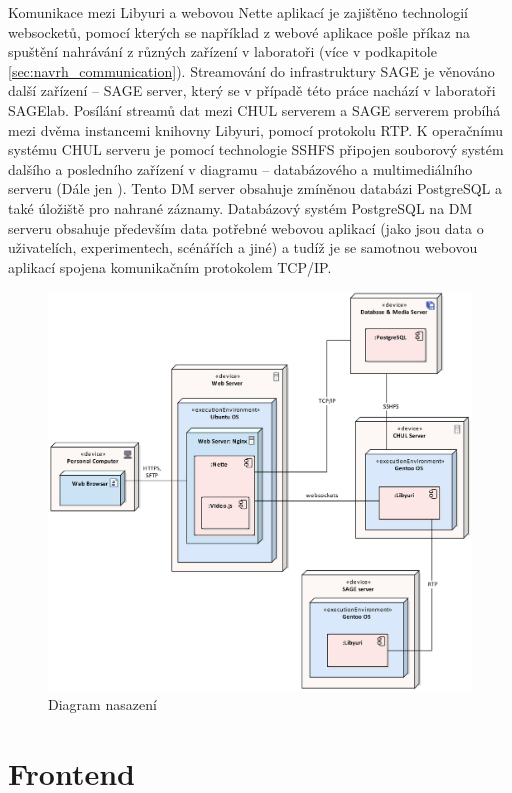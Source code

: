 \documentclass[thesis=M,czech]{FITthesis}[2012/06/26]
\begin{document}
Komunikace mezi Libyuri a webovou Nette aplikací je zajištěno technologií websocketů, pomocí kterých se například z webové aplikace pošle příkaz na spuštění nahrávání z různých zařízení v laboratoři (více v podkapitole \ref{sec:navrh_communication}). Streamování do infrastruktury SAGE je věnováno další zařízení -- SAGE server, který se v případě této práce nachází v laboratoři SAGElab. Posílání streamů dat mezi CHUL serverem a SAGE serverem probíhá mezi dvěma instancemi knihovny Libyuri, pomocí protokolu RTP. K operačnímu systému CHUL serveru je pomocí technologie SSHFS připojen souborový systém dalšího a posledního zařízení v diagramu -- databázového a multimediálního serveru (Dále jen ). Tento DM server obsahuje zmíněnou databázi PostgreSQL a také úložiště pro nahrané záznamy. Databázový systém PostgreSQL na DM serveru obsahuje především data potřebné webovou aplikací (jako jsou data o uživatelích, experimentech, scénářích a jiné) a tudíž je se samotnou webovou aplikací spojena komunikačním protokolem TCP/IP. 
\\
\begin{figure}[h]\centering
	\includegraphics[width=1\textwidth]{images/nasazeni_sage.eps}
	\caption{Diagram nasazení}\label{img:navrh_architektura_nasazeni}
\end{figure}


\section{Frontend} \label{sec:navrh_frontend}
\end{document}
